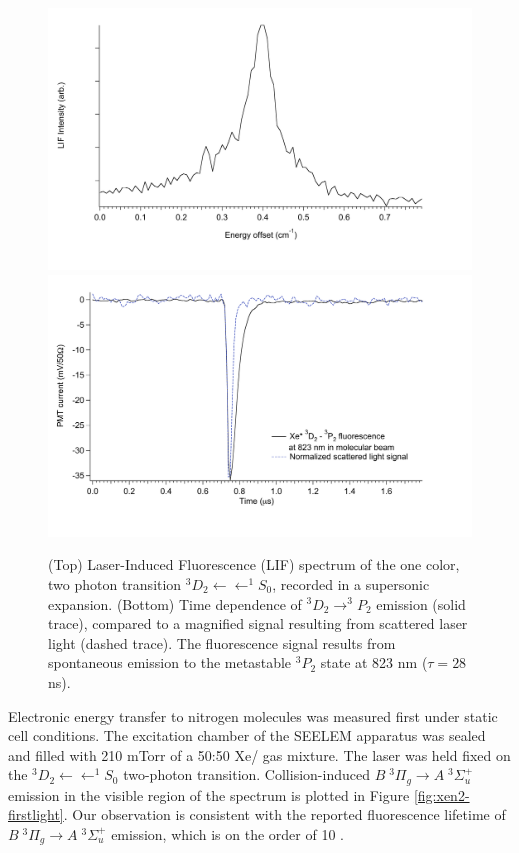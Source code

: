 \documentclass[12pt]{mitthesis}
\begin{document}
\begin{figure}
  \caption{(Top) Laser-Induced Fluorescence (LIF) spectrum of the one
    color, two photon transition  $^3D_2 \leftarrow \leftarrow
    ^1S_0$, recorded in a supersonic expansion.  (Bottom) Time
    dependence of  $^3D_2 \rightarrow ^3P_2$ emission (solid
    trace), compared to a magnified signal resulting from scattered
    laser light (dashed trace). The fluorescence signal results from
    spontaneous emission to the metastable $^3P_2$ state at 823 nm
    ($\tau = 28$ ns).}
  \label{fig:xe-beam}
  \centering
  \includegraphics[width=6in]{Xe-beamlif-060406-int.pdf}
  \includegraphics[width=6in]{Xe-beamtrc-060406.pdf}
\end{figure}

Electronic energy transfer to nitrogen molecules was measured first
under static cell conditions.  The excitation chamber of the SEELEM
apparatus was sealed and filled with 210 mTorr of a 50:50 Xe/
gas mixture.  The laser was held fixed on the  $^3D_2
\leftarrow \leftarrow ^1S_0$ two-photon transition.  Collision-induced
 $B \; ^3\Pi_g \rightarrow A \; ^3\Sigma_u^+$ emission in the visible
region of the spectrum is plotted in Figure \ref{fig:xen2-firstlight}.
Our observation is consistent with the reported fluorescence lifetime
of  $B \; ^3\Pi_g \rightarrow A \; ^3\Sigma_u^+$ emission, which is on the
order of 10 \microsec.
\end{document}

